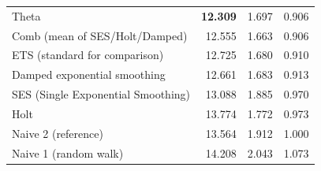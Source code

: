 \begin{table}[t]
\begin{tabular}{l r r r}
Theta                                  & \textbf{12.309} & 1.697 & 0.906 \\
Comb (mean of SES/Holt/Damped)         & 12.555 & 1.663 & 0.906 \\
ETS (standard for comparison)          & 12.725 & 1.680 & 0.910 \\
Damped exponential smoothing           & 12.661 & 1.683 & 0.913 \\
SES (Single Exponential Smoothing)     & 13.088 & 1.885 & 0.970 \\
Holt                                   & 13.774 & 1.772 & 0.973 \\
Naive 2 (reference)                    & 13.564 & 1.912 & 1.000 \\
Naive 1 (random walk)                  & 14.208 & 2.043 & 1.073 \\
\bottomrule
\end{tabular}
\end{table}


